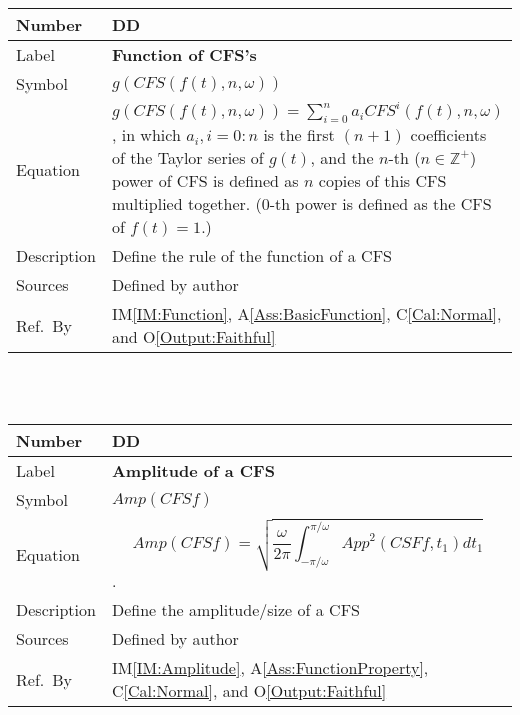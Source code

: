 \documentclass[12pt]{article}
\newcommand{\colAwidth}{0.13\textwidth}
\newcommand{\colBwidth}{0.82\textwidth}
\newcounter{defnum} %
\newcounter{datadefnum} %
\newcommand{\aref}[1]{A\ref{#1}}
\newcommand{\calref}[1]{C\ref{#1}}
\newcommand{\oref}[1]{O\ref{#1}}
\newcommand{\iref}[1]{IM\ref{#1}}
\begin{document}
\noindent
\begin{minipage}{\textwidth}
	\renewcommand*{\arraystretch}{1.5}
	\begin{tabular}{| p{\colAwidth} | p{\colBwidth}|}
		\hline
		\rowcolor[gray]{0.9}
		Number& DD{datadefnum}\thedatadefnum 
		\label{DD:Function}\\
		\hline
		Label& \bf Function of CFS's\\
		\hline
		Symbol &$g(\mathit{CFS}(f(t), n, \omega))$\\
		\hline
		Equation& $g(\mathit{CFS}(f(t), n, \omega))=\sum_{i=0}^{n}a_i 
		\mathit{CFS}^i(f(t), n, \omega)$, in which $a_i, i=0:n$ is 
		the first $(n+1)$ coefficients of the Taylor series of $g(t)$, and 
		the $n$-th ($n\in\mathbb{Z}^{+}$) power of CFS is defined as $n$ 
		copies of this CFS multiplied together. ($0$-th power is defined 
		as the CFS of $f(t)=1$.)\\
		\hline
		Description & Define the rule of the function of a CFS\\
		\hline
		Sources& Defined by author\\
		\hline
		Ref.\ By & \iref{IM:Function}, \aref{Ass:BasicFunction}, 
		\calref{Cal:Normal}, and \oref{Output:Faithful}\\
		\hline
	\end{tabular}
\end{minipage}\\
~\newline

\noindent
\begin{minipage}{\textwidth}
	\renewcommand*{\arraystretch}{1.5}
	\begin{tabular}{| p{\colAwidth} | p{\colBwidth}|}
		\hline
		\rowcolor[gray]{0.9}
		Number& DD{datadefnum}\thedatadefnum 
		\label{DD:Amplitude}\\
		\hline
		Label& \bf Amplitude of a CFS\\
		\hline
		Symbol &$\mathit{Amp}(\mathit{CFSf})$\\
		\hline
		Equation& \begin{equation}
			\mathit{Amp}(\mathit{CFSf})=\sqrt{\frac{\omega}
			{2\pi}\int_{-\pi/\omega}^{\pi/\omega}
			\mathit{App}^2(\mathit{CSFf}, t_1)\textit{d}t_1}
		\end{equation}.\\
		\hline
		Description & Define the amplitude/size of a CFS\\
		\hline
		Sources& Defined by author\\
		\hline
		Ref.\ By & \iref{IM:Amplitude}, \aref{Ass:FunctionProperty}, 
		\calref{Cal:Normal}, and \oref{Output:Faithful}\\
		\hline
	\end{tabular}
\end{minipage}\\
~\newline
\end{document}
